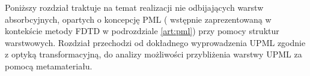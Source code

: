 Poniższy rozdział traktuje na temat realizacji nie odbijających warstw absorbcyjnych, opartych o koncepcję PML ( wstępnie zaprezentowaną w kontekście metody FDTD w podrozdziale \ref{art:pml}) przy pomocy struktur warstwowych. Rozdział przechodzi od dokładnego wyprowadzenia UPML zgodnie z optyką transformacyjną, do analizy możliwości przybliżenia warstwy UPML za pomocą metamateriału.

